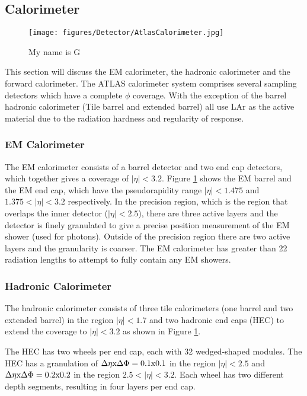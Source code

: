 \subsection{Calorimeter}
\label{sec:Det:Cal}

\begin{figure}
  \centering
  \texttt{[image: figures/Detector/AtlasCalorimeter.jpg]}
  \caption[ATLAS calorimeter system]{
\label{Det:ATLASCalo}
My name is G
}
\end{figure}

This section will discuss the EM calorimeter, the hadronic calorimeter and the forward calorimeter. 
The ATLAS calorimeter system comprises several sampling detectors which have a complete $\phi$ coverage.
With the exception of the barrel hadronic calorimeter (Tile barrel and extended barrel) all use LAr as the active material due to the radiation hardness and regularity of response.

\subsubsection{EM Calorimeter}

The EM calorimeter consists of a barrel detector and two end cap detectors, which together gives a coverage of $|\eta|<3.2$.
Figure \ref{Det:ATLASCalo} shows the EM barrel and the EM end cap, which have the pseudorapidity range $|\eta|<1.475$ and $1.375<|\eta|<3.2$ respectively.
In the precision region,  which is the region that overlaps the inner detector ($|\eta|<2.5$), there are three active layers and the detector is finely granulated to give a precise position measurement of the EM shower (used for photons).
Outside of the precision region there are two active layers and the granularity is coarser. 
The EM calorimeter has greater than 22 radiation lengths to attempt to fully contain any EM showers.


\subsubsection{Hadronic Calorimeter}

The hadronic calorimeter consists of three tile calorimeters (one barrel and two extended barrel) in the region $|\eta|<1.7$ and two hadronic end caps (HEC) to extend the coverage to $|\eta|<3.2$ as shown in Figure \ref{Det:ATLASCalo}.  

The HEC has two wheels per end cap, each with 32 wedged-shaped modules. 
The HEC has a granulation of $\Delta\eta \rm{x} \Delta\Phi = 0.1\rm{x}0.1$ in the region $|\eta|<2.5$ and $\Delta\eta \rm{x} \Delta\Phi = 0.2\rm{x}0.2$ in the region $2.5<|\eta|<3.2$. 
Each wheel has two different depth segments, resulting in four layers per end cap.


